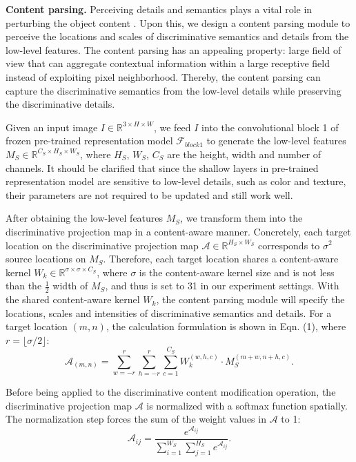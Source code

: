 \documentclass[letterpaper]{article} %
\begin{document}
\textbf{Content parsing.} Perceiving details and semantics plays a vital role in perturbing the object content \cite{DBLP:conf/mm/WangWLO20,DBLP:conf/aaai/WangLWO21, DBLP:conf/icmcs/WangWZLL19}. Upon this, we design a content parsing module to perceive the locations and scales of discriminative semantics and details from the low-level features. The content parsing has an appealing property: large field of view that can aggregate contextual information within a large receptive field instead of exploiting pixel neighborhood. Thereby, the content parsing can capture the discriminative semantics from the low-level details while preserving the discriminative details.


Given an input image $ I \in \mathbb{R}^{3\times H \times W} $, we  feed $ I $ into the convolutional block 1 of frozen pre-trained representation model $ \mathcal{F}_{block1} $ to generate the low-level features $ M_S \in\mathbb{R}^{C_S \times H_S \times W_S} $, where $ H_S $, $W_S $, $ C_S $ are the height, width and number of channels. It should be clarified that since the shallow layers in pre-trained representation model are sensitive to low-level details, such as color and texture, their parameters are not required to be updated and still work well.





After obtaining the low-level features $ M_S $, we transform them into the discriminative projection map in a content-aware manner. Concretely, each target location on the discriminative projection map $ \mathcal{A} \in \mathbb{R}^{H_S \times W_S} $ corresponds to $ \sigma^2 $ source locations on $ M_S $. Therefore, each target location shares a content-aware kernel $ W_k \in \mathbb{R}^{ \sigma \times \sigma \times C_S } $, where $ \sigma $ is the content-aware kernel size and is not less than the $ \frac{1}{2} $ width of $ M_S $, and thus is set to 31 in our experiment settings. With the shared content-aware kernel $ W_k $, the content parsing module will specify the locations, scales and intensities of discriminative semantics and details. For a target location $ (m, n) $, the calculation formulation is shown in Eqn. (1), where $ r = \lfloor \sigma/2\rfloor $:
\begin{equation}
\mathcal{A}_{(m,n)} = \sum_{w=-r}^r\sum_{h=-r}^r \sum_{c=1}^{C_S} W_k^{(w,h,c)} \cdot M_S^{(m+w, n+h,c)}.
\end{equation}

Before being applied to the discriminative content modification operation, the discriminative projection map $ \mathcal{A} $ is normalized with a softmax function spatially. The normalization step forces the sum of the weight values in $ \mathcal{A} $ to 1:
\begin{equation}
\mathcal{A}_{ij}= \frac{e^{\mathcal{A}_{ij}}}{\sum_{i=1}^{W_S}\sum_{j=1}^{H_S}e^{\mathcal{A}_{ij}}}.
\end{equation}
\end{document}

